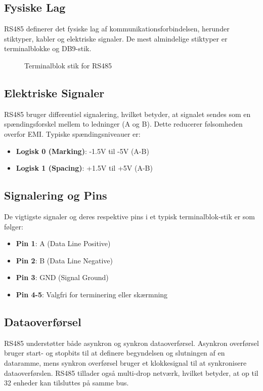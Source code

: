 \subsection{Fysiske Lag}
RS485 definerer det fysiske lag af kommunikationsforbindelsen, herunder stiktyper, kabler og elektriske signaler. De mest almindelige stiktyper er terminalblokke og DB9-stik.
\begin{figure}[h]
	\centering
	\caption{Terminalblok stik for RS485}
	\label{fig:rs485_connector}
\end{figure}

\subsection{Elektriske Signaler}
RS485 bruger differentiel signalering, hvilket betyder, at signalet sendes som en spændingsforskel mellem to ledninger (A og B). Dette reducerer følsomheden overfor EMI. Typiske spændingsniveauer er:
\begin{itemize}
	\item \textbf{Logisk 0 (Marking)}: -1.5V til -5V (A-B)
	\item \textbf{Logisk 1 (Spacing)}: +1.5V til +5V (A-B)
\end{itemize}

\subsection{Signalering og Pins}
De vigtigste signaler og deres respektive pins i et typisk terminalblok-stik er som følger:
\begin{itemize}
	\item \textbf{Pin 1}: A (Data Line Positive)
	\item \textbf{Pin 2}: B (Data Line Negative)
	\item \textbf{Pin 3}: GND (Signal Ground)
	\item \textbf{Pin 4-5}: Valgfri for terminering eller skærmning
\end{itemize}

\subsection{Dataoverførsel}
RS485 understøtter både asynkron og synkron dataoverførsel. Asynkron overførsel bruger start- og stopbits til at definere begyndelsen og slutningen af en dataramme, mens synkron overførsel bruger et klokkesignal til at synkronisere dataoverførslen. RS485 tillader også multi-drop netværk, hvilket betyder, at op til 32 enheder kan tilsluttes på samme bus.

